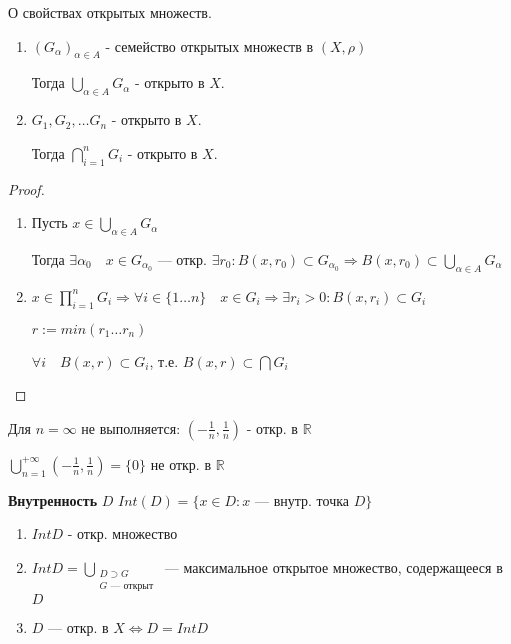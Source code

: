 \begin{theorem}
    О свойствах открытых множеств.

    \begin{enumerate}
        \item $(G_\alpha)_{\alpha\in A}$ - семейство открытых множеств в $(X,\rho)$
        
        Тогда $\bigcup\limits_{\alpha\in A} G_\alpha$ - открыто в $X$.

        \item $G_1,G_2,\ldots G_n$ - открыто в $X$.
        
        Тогда $\bigcap\limits_{i=1}^{n} G_i$ - открыто в $X$.
    \end{enumerate}

\end{theorem}

\begin{proof}
    \begin{enumerate}
        \item Пусть $x\in \bigcup_{\alpha\in A} G_\alpha$
        
        Тогда $\exists \alpha_0 \quad x\in G_{\alpha_0}$ --- откр. $\exists r_0 : B(x,r_0)\subset G_{\alpha_0} \Rightarrow B(x,r_0)\subset\bigcup_{\alpha\in A} G_\alpha$

        \item $x\in \prod_{i=1}^n G_i \Rightarrow \forall i\in\{1\ldots n\} \quad x\in G_i \Rightarrow \exists r_i>0 : B(x,r_i)\subset G_i$
        
        $r:=min(r_1\ldots r_n)$

        $\forall i \quad B(x,r)\subset G_i$, т.е. $B(x,r)\subset\bigcap G_i$
    \end{enumerate}
\end{proof}

\begin{remark}
    Для $n=\infty$ не выполняется: $(-\frac{1}{n},\frac{1}{n})$ - откр. в $\mathbb{R}$

    $\bigcup_{n=1}^{+\infty}(-\frac{1}{n},\frac{1}{n})=\{0\}$ не откр. в $\mathbb{R}$
\end{remark}

\begin{definition}
    \textbf{Внутренность} $D$ $Int(D)=\{x\in D : x \text{ --- внутр. точка }D\}$
\end{definition}

\begin{remark}
    \begin{enumerate}
        \item $Int D$ - откр. множество
        \item $Int D = \bigcup\limits_{\substack{D\supset G \\ G\text{ --- открыт}}}$ --- максимальное открытое множество, содержащееся в $D$
        \item $D$ --- откр. в $X \Leftrightarrow D=Int D$
    \end{enumerate}
\end{remark}

